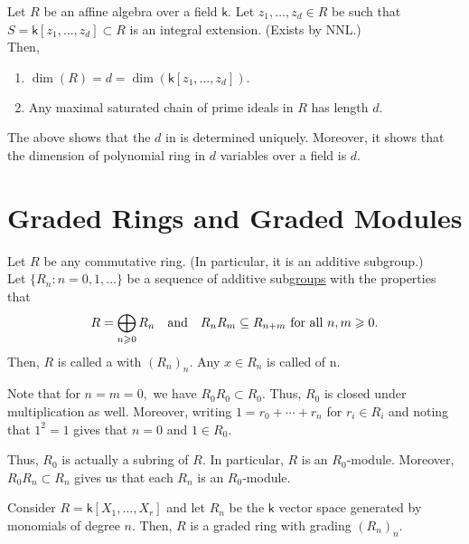 \documentclass[12pt]{article}	%
\begin{document}
\begin{thm}
	Let $R$ be an affine algebra over a field $\mathsf{k}.$ Let $z_1, \ldots, z_d \in R$ be such that $S = \mathsf{k}[z_1, \ldots, z_d] \subset R$ is an integral extension. \hfill {\color{ForestGreen}(Exists by NNL.)}\\
	Then,
	\begin{enumerate}
		\item $\dim(R) = d = \dim(\mathsf{k}[z_1, \ldots, z_d]).$
		\item Any maximal saturated chain of prime ideals in $R$ has length $d.$
	\end{enumerate}
\end{thm}
\begin{rem}
	The above shows that the $d$ in  is determined uniquely. Moreover, it shows that the dimension of polynomial ring in $d$ variables over a field is $d.$
\end{rem}

\section{Graded Rings and Graded Modules}

\begin{defn}%
	Let $R$ be any commutative ring. {\color{ForestGreen}(In particular, it is an additive subgroup.)}\\
	Let $\{R_n : n = 0, 1, \ldots\}$ be a sequence of additive sub\underline{groups} with the properties that
	\begin{equation*} 
		R = \bigoplus_{n \geqslant 0} R_n \quad\text{and}\quad R_nR_m \subseteq R_{n + m} \text{ for all } n, m \geqslant 0.
	\end{equation*}
	Then, $R$ is called a  with  $(R_n)_n.$ Any $x \in R_n$ is called  of  n.
\end{defn}

\begin{rem}
	Note that for $n = m = 0,$ we have $R_0R_0 \subset R_0.$ Thus, $R_0$ is closed under multiplication as well. Moreover, writing $1 = r_0 + \cdots + r_n$ for $r_i \in R_i$ and noting that $1^2 = 1$ gives that $n = 0$ and $1 \in R_0.$

	Thus, $R_0$ is actually a subring of $R.$ In particular, $R$ is an $R_0$-module. Moreover, $R_0R_n \subset R_n$ gives us that each $R_n$ is an $R_0$-module.
\end{rem}

\begin{ex}
	Consider $R = \mathsf{k}[X_1, \ldots, X_r]$ and let $R_n$ be the $\mathsf{k}$ vector space generated by monomials of degree $n.$ Then, $R$ is a graded ring with grading $(R_n)_n.$ 
\end{ex}
\end{document}
